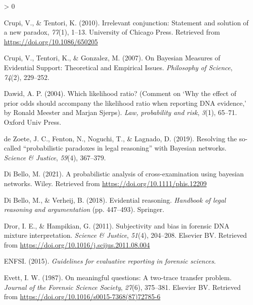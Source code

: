 \documentclass[
  10pt,
  dvipsnames,enabledeprecatedfontcommands]{scrartcl}
\newlength{\cslhangindent}
\newenvironment{CSLReferences}[2] %
 {%
  \setlength{\parindent}{0pt}
  \ifodd #1 \everypar{\setlength{\hangindent}{\cslhangindent}}\ignorespaces\fi
  \ifnum #2 > 0
  \setlength{\parskip}{#2\baselineskip}
  \fi
 }%
 {}
\begin{document}
\begin{CSLReferences}{1}{0}
\leavevmode\hypertarget{ref-CrupiTentori2010irrelevant}{}%
Crupi, V., \& Tentori, K. (2010). Irrelevant conjunction: Statement and
solution of a new paradox, \emph{77}(1), 1--13. University of Chicago
Press. Retrieved from \url{https://doi.org/10.1086/650205}

\leavevmode\hypertarget{ref-crupi2007BayesianMeasuresEvidential}{}%
Crupi, V., Tentori, K., \& Gonzalez, M. (2007). On {Bayesian Measures}
of {Evidential Support}: {Theoretical} and {Empirical Issues}.
\emph{Philosophy of Science}, \emph{74}(2), 229--252.

\leavevmode\hypertarget{ref-dawid2004likelihood}{}%
Dawid, A. P. (2004). Which likelihood ratio? (Comment on {`{W}hy the
effect of prior odds should accompany the likelihood ratio when
reporting {DNA} evidence,'} by {R}onald {M}eester and {M}arjan
{S}jerps). \emph{Law, probability and risk}, \emph{3}(1), 65--71. Oxford
Univ Press.

\leavevmode\hypertarget{ref-dezoete2019ResolvingSocalledProbabilistic}{}%
de Zoete, J. C., Fenton, N., Noguchi, T., \& Lagnado, D. (2019).
Resolving the so-called {``probabilistic paradoxes in legal reasoning''}
with {Bayesian} networks. \emph{Science \& Justice}, \emph{59}(4),
367--379.

\leavevmode\hypertarget{ref-Bello2021probabilisticCrossexamination}{}%
Di Bello, M. (2021). A probabilistic analysis of cross-examination using
bayesian networks. Wiley. Retrieved from
\url{https://doi.org/10.1111/phis.12209}

\leavevmode\hypertarget{ref-di2018evidential}{}%
Di Bello, M., \& Verheij, B. (2018). Evidential reasoning.
\emph{Handbook of legal reasoning and argumentation} (pp. 447--493).
Springer.

\leavevmode\hypertarget{ref-Dror2011subjectivity}{}%
Dror, I. E., \& Hampikian, G. (2011). Subjectivity and bias in forensic
{DNA} mixture interpretation. \emph{Science {\&} Justice}, \emph{51}(4),
204--208. Elsevier {BV}. Retrieved from
\url{https://doi.org/10.1016/j.scijus.2011.08.004}

\leavevmode\hypertarget{ref-enfs2015}{}%
ENFSI. (2015). \emph{Guidelines for evaluative reporting in forensic
sciences}.

\leavevmode\hypertarget{ref-Evett1987}{}%
Evett, I. W. (1987). On meaningful questions: A two-trace transfer
problem. \emph{Journal of the Forensic Science Society}, \emph{27}(6),
375--381. Elsevier {BV}. Retrieved from
\url{https://doi.org/10.1016/s0015-7368(87)72785-6}


\end{CSLReferences}
\end{document}
